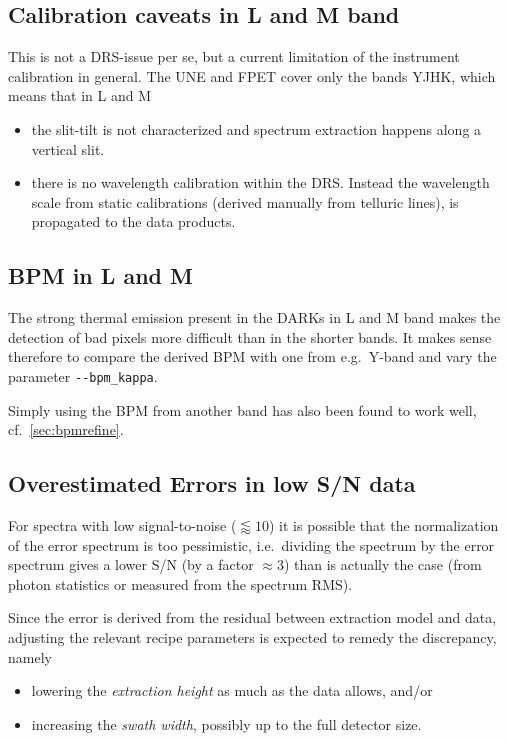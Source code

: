 \subsection{Calibration caveats in L and M band}

This is not a DRS-issue per se, but a current limitation of the instrument
calibration in general. The UNE and FPET cover only the bands YJHK, which means
that in L and M
\begin{itemize}
    \item the slit-tilt is not characterized and spectrum extraction happens
    along a vertical slit.
    \item there is no wavelength calibration within the DRS. Instead the
    wavelength scale from static calibrations (derived manually from telluric
    lines), is propagated to the data products.
\end{itemize}


\subsection{BPM in L and M}

The strong thermal emission present in the DARKs in L and M band makes the
detection of bad pixels more difficult than in the shorter bands. It makes sense
therefore to compare the derived BPM with one from e.g.~Y-band and vary the
parameter \verb!--bpm_kappa!.

Simply using the BPM from another band has also been found to work well, cf.~\ref*{sec:bpmrefine}.

\subsection{Overestimated Errors in low S/N data}

For spectra with low signal-to-noise ($\lessapprox  10$) it is possible that the
normalization of the error spectrum is too pessimistic, i.e.~dividing the
spectrum by the error spectrum gives a lower S/N (by a factor $\approx 3$) than
is actually the case (from photon statistics or measured from the spectrum RMS).

Since the error is derived from the residual between extraction model and data, adjusting the relevant recipe parameters is expected to remedy the discrepancy, namely
\begin{itemize}
    \item lowering the \emph{extraction height} as much as the data allows, and/or
    \item increasing the \emph{swath width}, possibly up to the full detector size.
\end{itemize}

